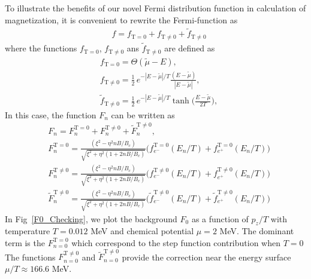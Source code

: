 \documentclass[sn-mathphys,Numbered]{sn-jnl}
\begin{document}
To illustrate the benefits of our novel Fermi distribution function in calculation of magnetization, it is convenient to rewrite the Fermi-function as 
\begin{align}
&f=f_{\mathrm{T=0}}+f_\mathrm{T\neq0}+\tilde f_\mathrm{T\neq0}
\end{align}
where the functions $f_{\mathrm{T=0}}$, $f_\mathrm{T\neq0}$ ans $\tilde f_\mathrm{T\neq0}$ are defined as
\begin{align}
&f_{\mathrm{T=0}}=\Theta(\widetilde\mu-E),\\
&f_\mathrm{T\neq0}=\frac{1}{2}\,e^{-|E-\widetilde\mu|/T}\frac{(E-\widetilde\mu)}{|E-\widetilde\mu|},\\ 
&\tilde f_\mathrm{T\neq0}=\frac{1}{2}\,e^{-|E-\widetilde\mu|/T}\tanh\bigg(\frac{E-\widetilde\mu}{2T}\bigg),
\end{align}
In this case, the function $F_n$ can be written as
\begin{align}
&F_n=F_n^{\mathrm{T=0}}+F_n^{\mathrm{T\neq0}}+\widetilde F_n^{\mathrm{T\neq0}},\\
&F_n^{\mathrm{T=0}}=\frac{(\xi^2-\eta^2nB/B_c)}{\sqrt{\xi^2+\eta^2\left(1+2nB/B_c\right)}}\bigg(f^{\mathrm{T=0}}_{e^-}(E_n/T)+f^{\mathrm{T=0}}_{e^+}(E_n/T)\bigg)\\
&F_n^{\mathrm{T\neq0}}=\frac{(\xi^2-\eta^2nB/B_c)}{\sqrt{\xi^2+\eta^2\left(1+2nB/B_c\right)}}\bigg(f^{\mathrm{T\neq0}}_{e^-}(E_n/T)+f^{\mathrm{T\neq0}}_{e^+}(E_n/T)\bigg)\\
&\widetilde F_n^{\mathrm{T\neq0}}=\frac{(\xi^2-\eta^2nB/B_c)}{\sqrt{\xi^2+\eta^2\left(1+2nB/B_c\right)}}\bigg(\tilde f^{\mathrm{T\ne0}}_{e^-}(E_n/T)+\tilde f^{\mathrm{T\neq0}}_{e^+}(E_n/T)\bigg)
\end{align}
In Fig~\ref{F0_Checking}, we plot the background  $F_0$ as a function of $p_z/T$ with temperature $T=0.012$ MeV and chemical potential $\mu=2$ MeV. The dominant term is the $F_{n=0}^{\mathrm{T=0}}$ which correspond to the step function contribution when $T=0$ The functions $F_{n=0}^{\mathrm{T\neq0}}$ and $\widetilde F_{n=0}^{\mathrm{T\neq0}}$ provide the correction near the energy surface $\mu/T\approx166.6$ MeV.
\end{document}
